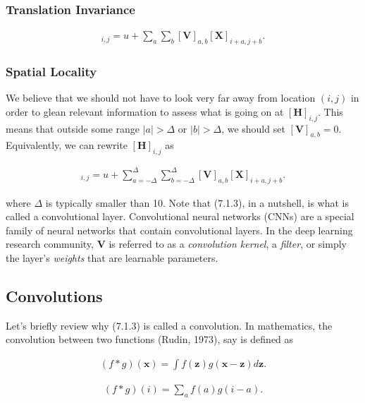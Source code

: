 \documentclass[a4paper,12pt]{article}
\theoremstyle{definition}
\begin{document}
\subsubsection*{Translation Invariance}

\begin{align*}
    [\mathbf{H}]_{i, j} = u + \sum_a\sum_b [\mathbf{V}]_{a, b}  [\mathbf{X}]_{i+a, j+b}.
\end{align*}


\subsubsection*{Spatial Locality}
We believe that we should not have to look very far away from location $(i, j)$ in order to glean relevant information to assess what is going on at $[\mathbf{H}]_{i, j}$.
This means that outside some range $|a|> \Delta$ or $|b| > \Delta$, we should set $[\mathbf{V}]_{a, b} = 0$. Equivalently, we can rewrite $[\mathbf{H}]_{i, j}$ as

\begin{align*}
    [\mathbf{H}]_{i, j} = u + \sum_{a = -\Delta}^{\Delta} \sum_{b = -\Delta}^{\Delta} [\mathbf{V}]_{a, b}  [\mathbf{X}]_{i+a, j+b}.
\end{align*}

where $\Delta$ is typically smaller than 10. Note that (7.1.3), in a nutshell, is what is called a convolutional layer. Convolutional neural networks (CNNs) are a special
family of neural networks that contain convolutional layers. In the deep learning research community, $\mathbf{V}$ is referred to as a \emph{convolution kernel}, a \emph{filter},
or simply the layer's \emph{weights} that are learnable parameters.

\subsection{Convolutions}
Let's briefly review why (7.1.3) is called a convolution. In mathematics, the convolution between two functions (Rudin, 1973), say
is defined as

\begin{align*}
    (f * g)(\mathbf{x}) = \int f(\mathbf{z}) g(\mathbf{x}-\mathbf{z}) d\mathbf{z}.
\end{align*}



\begin{align*}
    (f * g)(i) = \sum_a f(a) g(i-a).
\end{align*}
\end{document}
